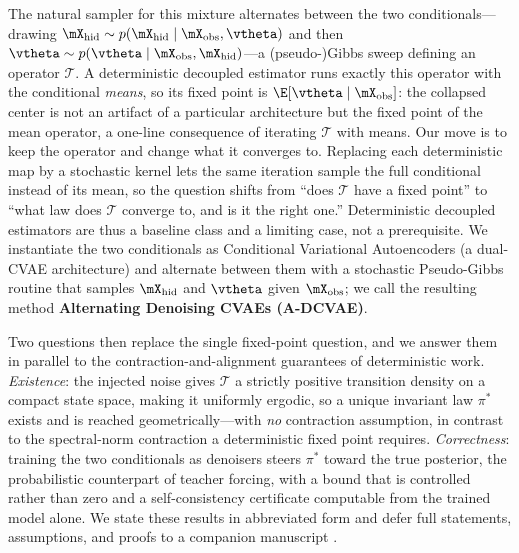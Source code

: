 \documentclass{article} %
\begin{document}
The natural sampler for this mixture alternates between the two conditionals---drawing $\mX_{\mathrm{hid}} \sim p(\mX_{\mathrm{hid}} \mid \mX_{\mathrm{obs}}, \vtheta)$ and then $\vtheta \sim p(\vtheta \mid \mX_{\mathrm{obs}}, \mX_{\mathrm{hid}})$---a (pseudo-)Gibbs sweep defining an operator $\mathcal{T}$. A deterministic decoupled estimator runs exactly this operator with the conditional \emph{means}, so its fixed point is $\E[\vtheta \mid \mX_{\mathrm{obs}}]$: the collapsed center is not an artifact of a particular architecture but the fixed point of the mean operator, a one-line consequence of iterating $\mathcal{T}$ with means. Our move is to keep the operator and change what it converges to. Replacing each deterministic map by a stochastic kernel lets the same iteration sample the full conditional instead of its mean, so the question shifts from ``does $\mathcal{T}$ have a fixed point'' to ``what law does $\mathcal{T}$ converge to, and is it the right one.'' Deterministic decoupled estimators are thus a baseline class and a limiting case, not a prerequisite. We instantiate the two conditionals as Conditional Variational Autoencoders (a dual-CVAE architecture) and alternate between them with a stochastic Pseudo-Gibbs routine that samples $\mX_{\mathrm{hid}}$ and $\vtheta$ given $\mX_{\mathrm{obs}}$; we call the resulting method \textbf{Alternating Denoising CVAEs (A-DCVAE)}.

Two questions then replace the single fixed-point question, and we answer them in parallel to the contraction-and-alignment guarantees of deterministic work. \emph{Existence}: the injected noise gives $\mathcal{T}$ a strictly positive transition density on a compact state space, making it uniformly ergodic, so a unique invariant law $\pi^\ast$ exists and is reached geometrically---with \emph{no} contraction assumption, in contrast to the spectral-norm contraction a deterministic fixed point requires. \emph{Correctness}: training the two conditionals as denoisers steers $\pi^\ast$ toward the true posterior, the probabilistic counterpart of teacher forcing, with a bound that is controlled rather than zero and a self-consistency certificate computable from the trained model alone. We state these results in abbreviated form and defer full statements, assumptions, and proofs to a companion manuscript \citep{adcvae-theory}.
\end{document}
